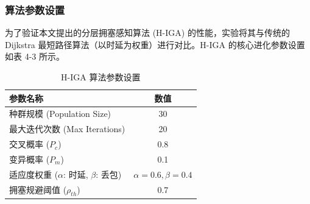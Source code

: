     
    
    \subsubsection{算法参数设置}
    为了验证本文提出的分层拥塞感知算法 (H-IGA) 的性能，实验将其与传统的 Dijkstra 最短路径算法（以时延为权重）进行对比。H-IGA 的核心进化参数设置如表 4-3 所示。
    
    \begin{table}[htbp]
      \caption{H-IGA 算法参数设置}
      \centering
      \begin{tabular}{lc}
        \toprule
        \textbf{参数名称} & \textbf{数值} \\
        \midrule
        种群规模 (Population Size) & 30 \\
        最大迭代次数 (Max Iterations) & 20 \\
        交叉概率 ($P_c$) & 0.8 \\
        变异概率 ($P_m$) & 0.1 \\
        适应度权重 ($\alpha$: 时延, $\beta$: 丢包) & $\alpha=0.6, \beta=0.4$ \\
        拥塞规避阈值 ($\rho_{th}$) & 0.7 \\
        \bottomrule
      \end{tabular}
      \label{tab:iga_params}
    \end{table}

    

    